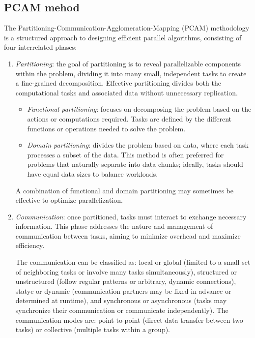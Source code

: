 \subsection{PCAM mehod}
The Partitioning-Communication-Agglomeration-Mapping (PCAM) methodology is a structured approach to designing efficient parallel algorithms, consisting of four interrelated phases:
\begin{enumerate}
    \item \textit{Partitioning}: the goal of partitioning is to reveal parallelizable components within the problem, dividing it into many small, independent tasks to create a fine-grained decomposition. 
        Effective partitioning divides both the computational tasks and associated data without unnecessary replication.
        \begin{itemize}
            \item \textit{Functional partitioning}: focuses on decomposing the problem based on the actions or computations required. 
                Tasks are defined by the different functions or operations needed to solve the problem.
            \item \textit{Domain partitioning}: divides the problem based on data, where each task processes a subset of the data. 
                This method is often preferred for problems that naturally separate into data chunks; ideally, tasks should have equal data sizes to balance workloads.
        \end{itemize}
        A combination of functional and domain partitioning may sometimes be effective to optimize parallelization.
    \item \textit{Communication}: once partitioned, tasks must interact to exchange necessary information. 
        This phase addresses the nature and management of communication between tasks, aiming to minimize overhead and maximize efficiency.
        
        The communication can be classified as: local or global (limited to a small set of neighboring tasks or involve many tasks simultaneously), structured or unstructured (follow regular patterns or arbitrary, dynamic connections), statyc or dynamic (communication partners may be fixed in advance or determined at runtime), and synchronous or asynchronous (tasks may synchronize their communication or communicate independently).
        The communication modes are: point-to-point (direct data transfer between two tasks) or collective (multiple tasks within a group). 


\end{enumerate}
